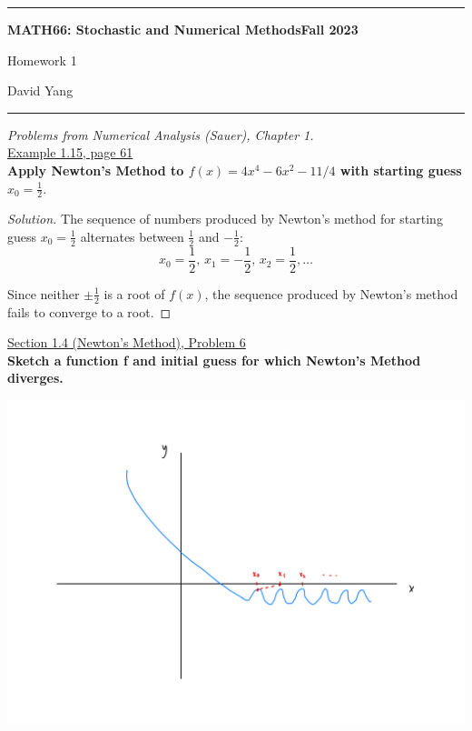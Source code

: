 \documentclass[11pt]{article}
\newenvironment{solution}
  {\renewcommand\qedsymbol{$\blacksquare$}\begin{proof}[Solution]}
  {\end{proof}}
\theoremstyle{definition}
\begin{document}
	\hrule
	\begin{center}
        \textbf{MATH66: Stochastic and Numerical Methods}\hfill \textbf{Fall 2023}\newline

		{\Large Homework 1}

		David Yang
	\end{center}

\hrule

\vspace{1em}

\textit{Problems from Numerical Analysis (Sauer), Chapter 1.} \\

\underline{Example 1.15, page 61} \\

\textbf{Apply Newton's Method to $f(x) = 4x^4 - 6x^2 -11/4$ with starting guess $x_0 = \frac{1}{2}.$} \\

\begin{solution} The sequence of numbers produced by Newton's method for starting guess $x_0 = \frac{1}{2}$ alternates between $\frac{1}{2}$ and $-\frac{1}{2}$:
\[ x_0 = \frac{1}{2}, \, x_1 = -\frac{1}{2}, \, x_2 = \frac{1}{2}, \dots \]

Since neither $\pm \frac{1}{2}$ is a root of $f(x)$, the sequence produced by Newton's method fails to converge to a root. \end{solution}

\vspace{1.5cm}

\underline{Section 1.4 (Newton's Method), Problem 6} \\

\textbf{Sketch a function f and initial guess for which Newton's Method diverges.} 

\includegraphics[scale = 0.25]{M66_1.4.6.jpeg}
\end{document}
